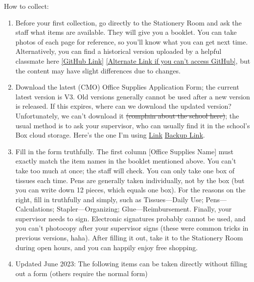 \hfill\break
How to collect:
\begin{enumerate}
    \item Before your first collection, go directly to the Stationery Room and ask the staff what items are available. They will give you a booklet. You can take photos of each page for reference, so you’ll know what you can get next time. Alternatively, you can find a historical version uploaded by a helpful classmate here \href{https://github.com/kaiwu-astro/xp_pgrs_unofficial_guide/tree/main/fileshare}{[GitHub Link]} \href{https://gitee.com/kaiwu-astro/xp_pgrs_unofficial_guide/tree/main/fileshare}{[Alternate Link if you can't access GitHub]}, but the content may have slight differences due to changes.
    \item Download the latest (CMO) Office Supplies Application Form; the current latest version is V3. Old versions generally cannot be used after a new version is released. If this expires, where can we download the updated version? Unfortunately, we can't download it \sout{(complain about the school here)}; the usual method is to ask your supervisor, who can usually find it in the school's Box cloud storage. Here's the one I'm using \href{https://github.com/kaiwu-astro/xp_pgrs_unofficial_guide/tree/main/fileshare}{Link} \href{https://gitee.com/kaiwu-astro/xp_pgrs_unofficial_guide/tree/main/fileshare}{Backup Link}.
    \item Fill in the form truthfully. The first column [Office Supplies Name] must exactly match the item names in the booklet mentioned above. You can't take too much at once; the staff will check. You can only take one box of tissues each time. Pens are generally taken individually, not by the box (but you can write down 12 pieces, which equals one box). For the reasons on the right, fill in truthfully and simply, such as Tissues—Daily Use; Pens—Calculations; Stapler—Organizing; Glue—Reimbursement. Finally, your supervisor needs to sign. Electronic signatures probably cannot be used, and you can't photocopy after your supervisor signs (these were common tricks in previous versions, haha). After filling it out, take it to the Stationery Room during open hours, and you can happily enjoy free shopping.
    \item Updated June 2023: The following items can be taken directly without filling out a form (others require the normal form)
\end{enumerate}

